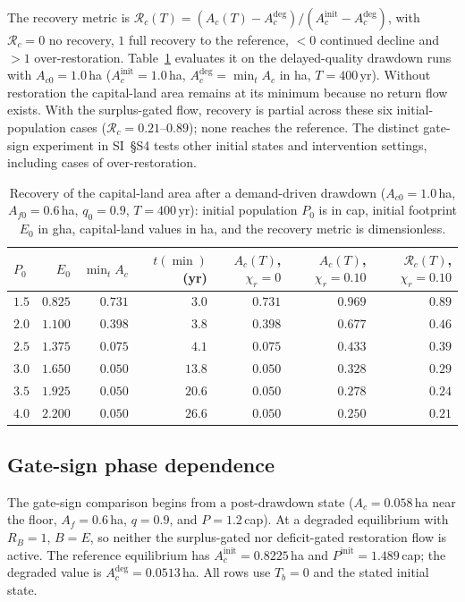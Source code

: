 \documentclass[11pt,a4paper]{article}
\begin{document}
The recovery metric is $\mathcal R_c(T)=(A_c(T)-A_c^{\mathrm{deg}})/(A_c^{\mathrm{init}}-A_c^{\mathrm{deg}})$, with $\mathcal R_c=0$ no recovery, $1$ full recovery to the reference, $<0$ continued decline and $>1$ over-restoration. Table~\ref{tab:si_recovery} evaluates it on the delayed-quality drawdown runs with $A_{c0}=1.0$\,ha ($A_c^{\mathrm{init}}=1.0$\,ha, $A_c^{\mathrm{deg}}=\min_tA_c$ in ha, $T=400$\,yr). Without restoration the capital-land area remains at its minimum because no return flow exists. With the surplus-gated flow, recovery is partial across these six initial-population cases ($\mathcal R_c=0.21$--$0.89$); none reaches the reference. The distinct gate-sign experiment in SI~\S S4 tests other initial states and intervention settings, including cases of over-restoration.

\begin{table}[htbp]
\centering\small
\caption{Recovery of the capital-land area after a demand-driven drawdown ($A_{c0}=1.0$\,ha, $A_{f0}=0.6$\,ha, $q_0=0.9$, $T=400$\,yr): initial population $P_0$ is in cap, initial footprint $E_0$ in gha, capital-land values in ha, and the recovery metric is dimensionless.}
\label{tab:si_recovery}
\begin{tabular}{l r r r r r r}
\toprule
$P_0$ & $E_0$ & $\min_tA_c$ & $t(\min)$ (yr) & $A_c(T)$, $\chi_r=0$ & $A_c(T)$, $\chi_r=0.10$ & $\mathcal R_c(T)$, $\chi_r=0.10$ \\
\midrule
$1.5$ & $0.825$ & $0.731$ & $3.0$ & $0.731$ & $0.969$ & $0.89$ \\
$2.0$ & $1.100$ & $0.398$ & $3.8$ & $0.398$ & $0.677$ & $0.46$ \\
$2.5$ & $1.375$ & $0.075$ & $4.1$ & $0.075$ & $0.433$ & $0.39$ \\
$3.0$ & $1.650$ & $0.050$ & $13.8$ & $0.050$ & $0.328$ & $0.29$ \\
$3.5$ & $1.925$ & $0.050$ & $20.6$ & $0.050$ & $0.278$ & $0.24$ \\
$4.0$ & $2.200$ & $0.050$ & $26.6$ & $0.050$ & $0.250$ & $0.21$ \\
\bottomrule
\end{tabular}
\end{table}

\subsection{Gate-sign phase dependence}\label{si:gates}

The gate-sign comparison begins from a post-drawdown state ($A_c=0.058$\,ha near the floor, $A_f=0.6$\,ha, $q=0.9$, and $P=1.2$\,cap). At a degraded equilibrium with $R_B=1$, $B=E$, so neither the surplus-gated nor deficit-gated restoration flow is active. The reference equilibrium has $A_c^{\mathrm{init}}=0.8225$\,ha and $P^{\mathrm{init}}=1.489$\,cap; the degraded value is $A_c^{\mathrm{deg}}=0.0513$\,ha. All rows use $T_b=0$ and the stated initial state.
\end{document}
